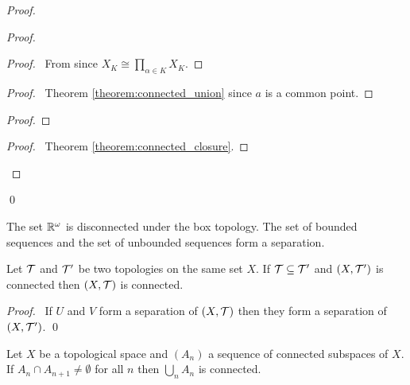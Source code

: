 \begin{proof}
\begin{proof}
        \begin{proof}
            \pf\ From  since $X_K \cong \prod_{\alpha \in K} X_K$.
        \end{proof}
        \begin{proof}
            \pf\ Theorem \ref{theorem:connected_union} since $a$ is a common point.
        \end{proof}
        \begin{proof}
        \end{proof}
        \begin{proof}
            \pf\ Theorem \ref{theorem:connected_closure}.
        \end{proof}          
    \end{proof}
    \qed
\end{proof}

\begin{example}
    The set $\mathbb{R}^\omega$ is disconnected under the box topology. The set of bounded sequences and the set of unbounded sequences form
    a separation.
\end{example}

\begin{proposition}
    Let $\mathcal{T}$ and $\mathcal{T}'$ be two topologies on the same set $X$. If $\mathcal{T} \subseteq \mathcal{T}'$ and $(X, \mathcal{T}')$ is connected then $(X, \mathcal{T})$ is connected.
\end{proposition}

\begin{proof}
    \pf\ If $U$ and $V$ form a separation of $(X, \mathcal{T})$ then they form a separation of $(X, \mathcal{T}')$. \qed
\end{proof}

\begin{proposition}
    Let $X$ be a topological space and $(A_n)$ a sequence of connected subspaces of $X$. If $A_n \cap A_{n+1} \neq \emptyset$ for all $n$ then $\bigcup_n A_n$ is
    connected.
\end{proposition}

